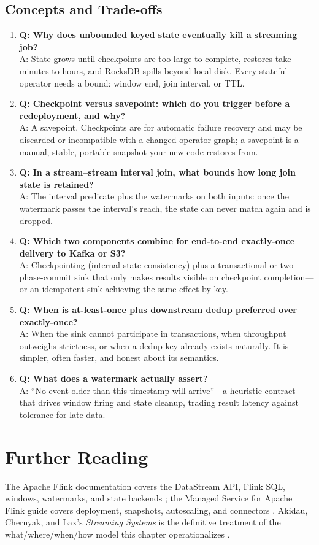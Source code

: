 \subsection{Concepts and Trade-offs}
\begin{enumerate}
    \item \textbf{Q: Why does unbounded keyed state eventually kill a streaming job?}\\
    A: State grows until checkpoints are too large to complete, restores take minutes to hours, and RocksDB spills beyond local disk. Every stateful operator needs a bound: window end, join interval, or TTL.
    \item \textbf{Q: Checkpoint versus savepoint: which do you trigger before a redeployment, and why?}\\
    A: A savepoint. Checkpoints are for automatic failure recovery and may be discarded or incompatible with a changed operator graph; a savepoint is a manual, stable, portable snapshot your new code restores from.
    \item \textbf{Q: In a stream--stream interval join, what bounds how long join state is retained?}\\
    A: The interval predicate plus the watermarks on both inputs: once the watermark passes the interval's reach, the state can never match again and is dropped.
    \item \textbf{Q: Which two components combine for end-to-end exactly-once delivery to Kafka or S3?}\\
    A: Checkpointing (internal state consistency) plus a transactional or two-phase-commit sink that only makes results visible on checkpoint completion---or an idempotent sink achieving the same effect by key.
    \item \textbf{Q: When is at-least-once plus downstream dedup preferred over exactly-once?}\\
    A: When the sink cannot participate in transactions, when throughput outweighs strictness, or when a dedup key already exists naturally. It is simpler, often faster, and honest about its semantics.
    \item \textbf{Q: What does a watermark actually assert?}\\
    A: ``No event older than this timestamp will arrive''---a heuristic contract that drives window firing and state cleanup, trading result latency against tolerance for late data.
\end{enumerate}

\section{Further Reading}
The Apache Flink documentation covers the DataStream API, Flink SQL, windows, watermarks, and state backends \cite{apacheFlinkDocs}; the Managed Service for Apache Flink guide covers deployment, snapshots, autoscaling, and connectors \cite{awsManagedFlinkDocs}. Akidau, Chernyak, and Lax's \emph{Streaming Systems} is the definitive treatment of the what/where/when/how model this chapter operationalizes \cite{akidauStreamingSystems}.

